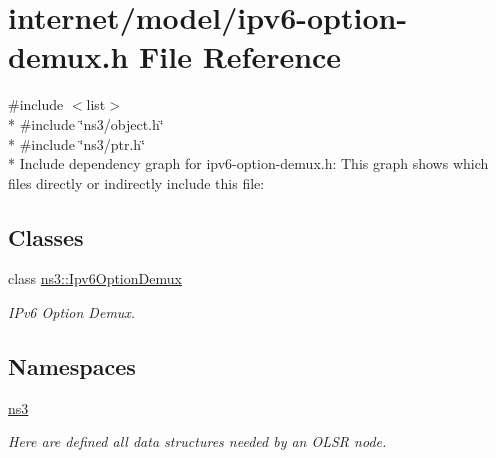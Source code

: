 \hypertarget{ipv6-option-demux_8h}{}\section{internet/model/ipv6-\/option-\/demux.h File Reference}
\label{ipv6-option-demux_8h}
{\ttfamily \#include $<$list$>$}\\*
{\ttfamily \#include \char`\"{}ns3/object.\+h\char`\"{}}\\*
{\ttfamily \#include \char`\"{}ns3/ptr.\+h\char`\"{}}\\*
Include dependency graph for ipv6-\/option-\/demux.h\+:
This graph shows which files directly or indirectly include this file\+:
\subsection*{Classes}
\begin{DoxyCompactItemize}
\item 
class \hyperlink{classns3_1_1Ipv6OptionDemux}{ns3\+::\+Ipv6\+Option\+Demux}
\begin{DoxyCompactList}\small\item\em I\+Pv6 Option Demux. \end{DoxyCompactList}\end{DoxyCompactItemize}
\subsection*{Namespaces}
\begin{DoxyCompactItemize}
\item 
 \hyperlink{namespacens3}{ns3}
\begin{DoxyCompactList}\small\item\em Here are defined all data structures needed by an O\+L\+SR node. \end{DoxyCompactList}\end{DoxyCompactItemize}
